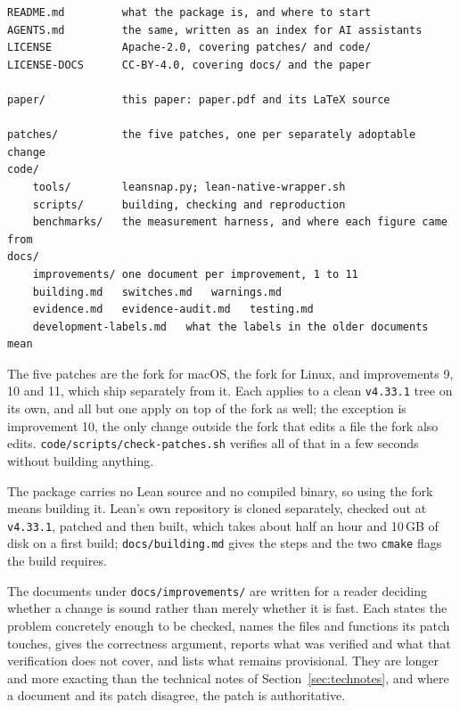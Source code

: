 \documentclass{article}
\newcommand{\Lean}{Lean\xspace}      %
\begin{document}
\begin{small}
\begin{verbatim}
README.md         what the package is, and where to start
AGENTS.md         the same, written as an index for AI assistants
LICENSE           Apache-2.0, covering patches/ and code/
LICENSE-DOCS      CC-BY-4.0, covering docs/ and the paper

paper/            this paper: paper.pdf and its LaTeX source

patches/          the five patches, one per separately adoptable change
code/
    tools/        leansnap.py; lean-native-wrapper.sh
    scripts/      building, checking and reproduction
    benchmarks/   the measurement harness, and where each figure came from
docs/
    improvements/ one document per improvement, 1 to 11
    building.md   switches.md   warnings.md
    evidence.md   evidence-audit.md   testing.md
    development-labels.md   what the labels in the older documents mean
\end{verbatim}
\end{small}

\noindent The five patches are the fork for macOS, the fork for Linux, and improvements 9, 10
and 11, which ship separately from it. Each
applies to a clean \texttt{v4.33.1} tree on its own, and all but one apply on top of the fork as
well; the exception is improvement 10, the only change outside the fork that edits a file the fork
also edits. \texttt{code/scripts/\allowbreak check-patches.sh} verifies all of that in a few
seconds without building anything.

The package carries no \Lean source and no compiled binary, so using the fork means building it. \Lean's own repository is cloned
separately, checked out at \texttt{v4.33.1}, patched and then built, which takes about half an hour
and 10\,GB of disk on a first build; \texttt{docs/building.md} gives the steps and the two
\texttt{cmake} flags the build requires.

The documents under \texttt{docs/improvements/} are written for a reader deciding whether a change
is sound rather than merely whether it is fast. Each states the problem concretely enough to be
checked, names the files and functions its patch touches, gives the correctness argument, reports
what was verified and what that verification does not cover, and lists what remains provisional.
They are longer and more exacting than the technical notes of Section~\ref{sec:technotes}, and
where a document and its patch disagree, the patch is authoritative.
\end{document}
